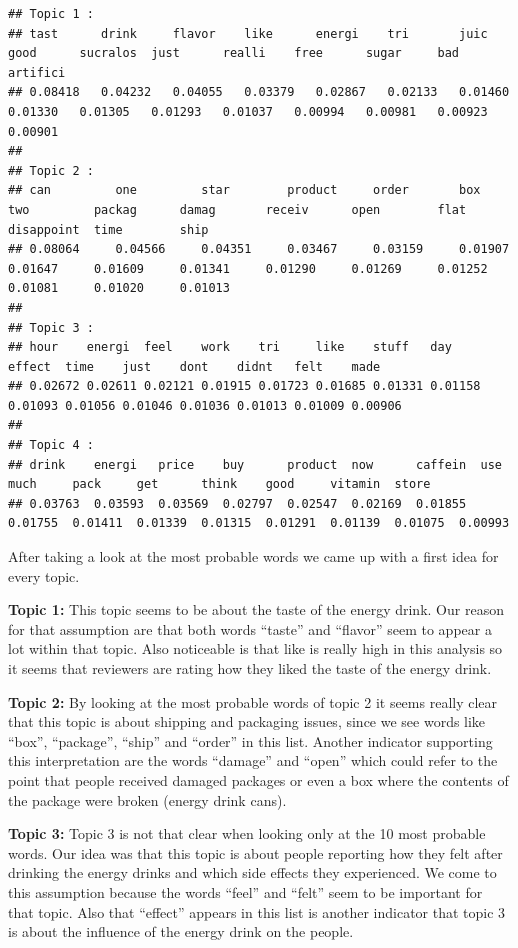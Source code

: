 \documentclass[
]{article}
\begin{document}
\begin{verbatim}
## Topic 1 :
## tast      drink     flavor    like      energi    tri       juic      good      sucralos  just      realli    free      sugar     bad       artifici  
## 0.08418   0.04232   0.04055   0.03379   0.02867   0.02133   0.01460   0.01330   0.01305   0.01293   0.01037   0.00994   0.00981   0.00923   0.00901   
## 
## Topic 2 :
## can         one         star        product     order       box         two         packag      damag       receiv      open        flat        disappoint  time        ship        
## 0.08064     0.04566     0.04351     0.03467     0.03159     0.01907     0.01647     0.01609     0.01341     0.01290     0.01269     0.01252     0.01081     0.01020     0.01013     
## 
## Topic 3 :
## hour    energi  feel    work    tri     like    stuff   day     effect  time    just    dont    didnt   felt    made    
## 0.02672 0.02611 0.02121 0.01915 0.01723 0.01685 0.01331 0.01158 0.01093 0.01056 0.01046 0.01036 0.01013 0.01009 0.00906 
## 
## Topic 4 :
## drink    energi   price    buy      product  now      caffein  use      much     pack     get      think    good     vitamin  store    
## 0.03763  0.03593  0.03569  0.02797  0.02547  0.02169  0.01855  0.01755  0.01411  0.01339  0.01315  0.01291  0.01139  0.01075  0.00993
\end{verbatim}

\normalsize

After taking a look at the most probable words we came up with a first
idea for every topic.

\textbf{Topic 1:} This topic seems to be about the taste of the energy
drink. Our reason for that assumption are that both words ``taste'' and
``flavor'' seem to appear a lot within that topic. Also noticeable is
that like is really high in this analysis so it seems that reviewers are
rating how they liked the taste of the energy drink.

\textbf{Topic 2:} By looking at the most probable words of topic 2 it
seems really clear that this topic is about shipping and packaging
issues, since we see words like ``box'', ``package'', ``ship'' and
``order'' in this list. Another indicator supporting this interpretation
are the words ``damage'' and ``open'' which could refer to the point
that people received damaged packages or even a box where the contents
of the package were broken (energy drink cans).

\textbf{Topic 3:} Topic 3 is not that clear when looking only at the 10
most probable words. Our idea was that this topic is about people
reporting how they felt after drinking the energy drinks and which side
effects they experienced. We come to this assumption because the words
``feel'' and ``felt'' seem to be important for that topic. Also that
``effect'' appears in this list is another indicator that topic 3 is
about the influence of the energy drink on the people.
\end{document}
